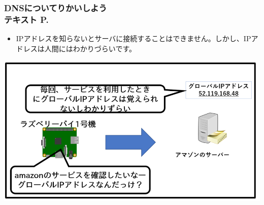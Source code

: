 \begin{frame}[fragile]
	\frametitle{DNSについてりかいしよう\\テキスト P.\pageref{1:P:DNS}~~~}
    \begin{itemize}\small
                \item IPアドレスを知らないとサーバに接続することはできません。しかし、IPアドレスは人間にはわかりづらいです。
            \end{itemize}
			\begin{minipage}{\textwidth}
                {\upshape
                  \includegraphics[width=\textwidth]{text07-img/ome7-img026.png}}
            \end{minipage}
\end{frame}

